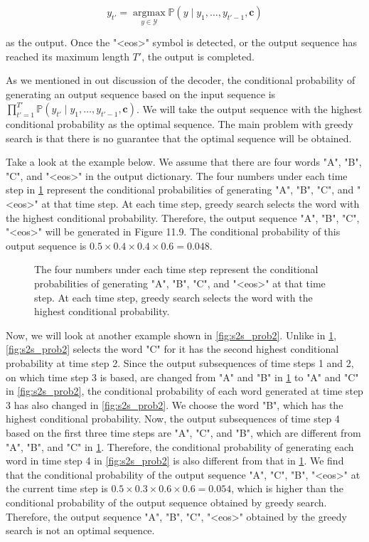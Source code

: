 $$y_{t'} = \operatorname*{argmax}_{y \in \mathcal{Y}} \mathbb{P}(y \mid y_1, \ldots, y_{t'-1}, \boldsymbol{c})$$

as the output.  Once the "<eos>" symbol is detected, or the output sequence has reached its maximum length $T'$, the output is completed.

As we mentioned in out discussion of the decoder, the conditional probability of generating an output sequence based on the input sequence is $\prod_{t'=1}^{T'} \mathbb{P}(y_{t'} \mid y_1, \ldots, y_{t'-1}, \boldsymbol{c})$. We will take the output sequence with the highest conditional probability as the optimal sequence. The main problem with greedy search is that there is no guarantee that the optimal sequence will be obtained.

Take a look at the example below. We assume that there are four words "A", "B", "C", and "<eos>" in the output dictionary.  The four numbers under each time step in \cref{fig:s2s_prob1} represent the conditional probabilities of generating "A", "B", "C", and "<eos>" at that time step.  At each time step, greedy search selects the word with the highest conditional probability. Therefore, the output sequence "A", "B", "C", "<eos>" will be generated in Figure 11.9. The conditional probability of this output sequence is $0.5\times0.4\times0.4\times0.6 = 0.048$.


\begin{figure}[hpt]
	\centering
	
	\caption{The four numbers under each time step represent the conditional probabilities of generating "A", "B", "C", and "<eos>" at that time step. At each time step, greedy search selects the word with the highest conditional probability.}
	\label{fig:s2s_prob1}
\end{figure}


Now, we will look at another example shown in \cref{fig:s2s_prob2}. Unlike in \cref{fig:s2s_prob1}, \cref{fig:s2s_prob2} selects the word "C" for it has the second highest conditional probability at time step 2. Since the output subsequences of time steps 1 and 2, on which time step 3 is based, are changed from "A" and "B" in \cref{fig:s2s_prob1} to "A" and "C" in \cref{fig:s2s_prob2}, the conditional probability of each word generated at time step 3 has also changed in \cref{fig:s2s_prob2}. We choose the word "B", which has the highest conditional probability. Now, the output subsequences of time step 4 based on the first three time steps are "A", "C", and "B", which are different from "A", "B", and "C" in \cref{fig:s2s_prob1}. Therefore, the conditional probability of generating each word in time step 4 in \cref{fig:s2s_prob2} is also different from that in \cref{fig:s2s_prob1}. We find that the conditional probability of the output sequence "A", "C", "B", "<eos>" at the current time step is $0.5\times0.3 \times0.6\times0.6=0.054$, which is higher than the conditional probability of the output sequence obtained by greedy search. Therefore, the output sequence "A", "B", "C", "<eos>" obtained by the greedy search is not an optimal sequence.

